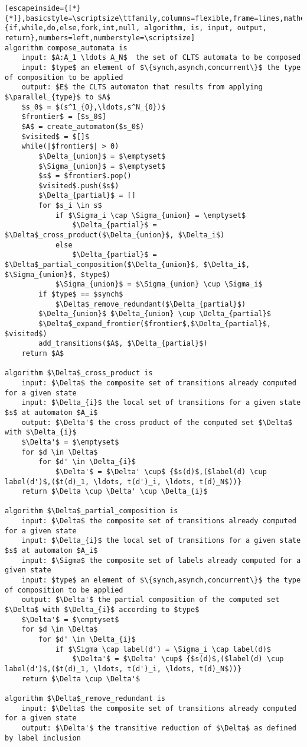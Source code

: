 \renewcommand{\ttdefault}{pcr}
\begin{lstlisting}[escapeinside={[*}{*]},basicstyle=\scriptsize\ttfamily,columns=flexible,frame=lines,mathescape=true,xleftmargin=3.0ex,keywordstyle=\textbf,morekeywords={if,while,do,else,fork,int,null, algorithm, is, input, output, return},numbers=left,numberstyle=\scriptsize]
algorithm compose_automata is
	input: $A:A_1 \ldots A_N$  the set of CLTS automata to be composed
	input: $type$ an element of $\{synch,asynch,concurrent\}$ the type of composition to be applied
	output: $E$ the CLTS automaton that results from applying $\parallel_{type}$ to $A$
	$s_0$ = $(s^1_{0},\ldots,s^N_{0})$
	$frontier$ = [$s_0$]
	$A$ = create_automaton($s_0$)
	$visited$ = $[]$
	while(|$frontier$| > 0)
		$\Delta_{union}$ = $\emptyset$
		$\Sigma_{union}$ = $\emptyset$		
		$s$ = $frontier$.pop()
		$visited$.push($s$)
		$\Delta_{partial}$ = []
		for $s_i \in s$ 
			if $\Sigma_i \cap \Sigma_{union} = \emptyset$
				$\Delta_{partial}$ = $\Delta$_cross_product($\Delta_{union}$, $\Delta_i$)
			else
				$\Delta_{partial}$ = $\Delta$_partial_composition($\Delta_{union}$, $\Delta_i$, $\Sigma_{union}$, $type$)
			$\Sigma_{union}$ = $\Sigma_{union} \cup \Sigma_i$
		if $type$ == $synch$
			$\Delta$_remove_redundant($\Delta_{partial}$)
		$\Delta_{union}$ $\Delta_{union} \cup \Delta_{partial}$ 
		$\Delta$_expand_frontier($frontier$,$\Delta_{partial}$, $visited$)				
		add_transitions($A$, $\Delta_{partial}$)
	return $A$

algorithm $\Delta$_cross_product is
	input: $\Delta$ the composite set of transitions already computed for a given state
	input: $\Delta_{i}$ the local set of transitions for a given state $s$ at automaton $A_i$
	output: $\Delta'$ the cross product of the computed set $\Delta$ with $\Delta_{i}$
	$\Delta'$ = $\emptyset$
	for $d \in \Delta$
		for $d' \in \Delta_{i}$
			$\Delta'$ = $\Delta' \cup$ {$s(d)$,($label(d) \cup label(d')$,($t(d)_1, \ldots, t(d')_i, \ldots, t(d)_N$))}
	return $\Delta \cup \Delta' \cup \Delta_{i}$
	
algorithm $\Delta$_partial_composition is
	input: $\Delta$ the composite set of transitions already computed for a given state
	input: $\Delta_{i}$ the local set of transitions for a given state $s$ at automaton $A_i$
	input: $\Sigma$ the composite set of labels already computed for a given state		
	input: $type$ an element of $\{synch,asynch,concurrent\}$ the type of composition to be applied
	output: $\Delta'$ the partial composition of the computed set $\Delta$ with $\Delta_{i}$ according to $type$
	$\Delta'$ = $\emptyset$
	for $d \in \Delta$
		for $d' \in \Delta_{i}$
			if $\Sigma \cap label(d') = \Sigma_i \cap label(d)$
				$\Delta'$ = $\Delta' \cup$ {$s(d)$,($label(d) \cup label(d')$,($t(d)_1, \ldots, t(d')_i, \ldots, t(d)_N$))}
	return $\Delta \cup \Delta'$	
	
algorithm $\Delta$_remove_redundant is
	input: $\Delta$ the composite set of transitions already computed for a given state
	output: $\Delta'$ the transitive reduction of $\Delta$ as defined by label inclusion
\end{lstlisting}